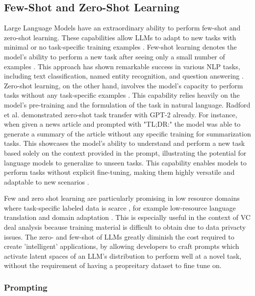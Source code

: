 \documentclass[a4paper, oneside]{discothesis}
\begin{document}
\subsection{Few-Shot and Zero-Shot Learning}
Large Language Models have an extraordinary ability to perform few-shot and zero-shot learning. These capabilities allow LLMs to adapt to new tasks with minimal or no task-specific training examples \cite{brown2020language}.
Few-shot learning denotes the model's ability to perform a new task after seeing only a small number of examples \cite{wang2020generalising}. This approach has shown remarkable success in various NLP tasks, including text classification, named entity recognition, and question answering \cite{gao2021making}. 
Zero-shot learning, on the other hand, involves the model's capacity to perform tasks without any task-specific examples \cite{xian2018zero}. 
This capability relies heavily on the model's pre-training and the formulation of the task in natural language. 
Radford et al. \cite{radford2019language} demonstrated zero-shot task transfer with GPT-2 already. For instance, when given a news article and prompted with "TL;DR:" the model was able to generate a summary of the article without any specific training for summarization tasks. This showcases the model's ability to understand and perform a new task based solely on the context provided in the prompt, illustrating the potential for language models to generalize to unseen tasks. This capability enables models to perform tasks without explicit fine-tuning, making them highly versatile and adaptable to new scenarios \cite{min2022rethinking}.

Few and zero shot learning are particularly promising in low resource domains where task-specific labeled data is scarce \cite{hedderich2021survey}, for example low-resource language translation \cite{garcia2020multilingual} and domain adaptation \cite{gururangan2020don}. This is especially useful in the context of VC deal analysis because training material is difficult to obtain due to data privacty issues. The zero- and few-shot  of LLMs greatly diminish the cost required to create 'intelligent' applications, by allowing developers to craft prompts which activate latent spaces of an LLM's distribution to perform well at a novel task, without the requirement of having a propreitary dataset to fine tune on.

\subsubsection{Prompting}
\end{document}
